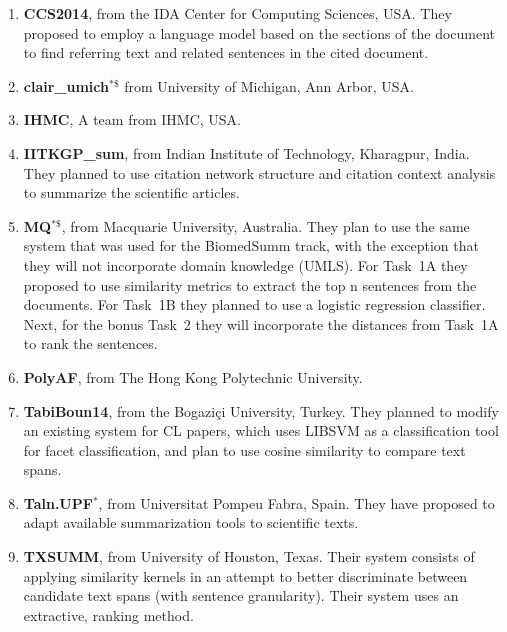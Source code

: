 \documentclass[11pt]{article}
\begin{document}
\begin{enumerate}
\item{{\bf CCS2014}, from the IDA Center for Computing Sciences,
  USA. They proposed to employ a language model based on the sections
  of the document to find referring text and related sentences in the
  cited document.}
\vspace{-.3cm}
\item{{\bf clair\_umich$^{*\$}$} from University of Michigan, Ann Arbor, USA.}
\vspace{-.3cm}
\item{{\bf IHMC}, A team from IHMC, USA.}
\vspace{-.3cm}
\item{{\bf IITKGP\_sum}, from Indian Institute of Technology,
  Kharagpur, India. They planned to use citation network structure and
  citation context analysis to summarize the scientific articles.}
\vspace{-.3cm}
\item{{\bf MQ$^{*\$}$}, from Macquarie University, Australia. They
  plan to use the same system that was used for the BiomedSumm track,
  with the exception that they will not incorporate domain knowledge
  (UMLS). For Task~1A they proposed to use similarity metrics to extract the
  top n sentences from the documents. For Task~1B they planned to use a
  logistic regression classifier. Next, for the bonus Task~2 they will 
  incorporate the distances from Task~1A to rank the sentences.
  }

\vspace{-.3cm}
\item{{\bf PolyAF}, from The Hong Kong Polytechnic University.}
\vspace{-.3cm}
\item{{\bf TabiBoun14}, from the Bogaziçi University, Turkey. They
  planned to modify an existing system for CL papers, which uses
  LIBSVM as a classification tool for facet classification, and plan to 
  use cosine similarity to compare text spans.}
\vspace{-.3cm}
\item{{\bf Taln.UPF$^{*}$}, from Universitat Pompeu Fabra, Spain. They
  have proposed to adapt available summarization tools to scientific
  texts.}
\vspace{-.3cm}
\item{{\bf TXSUMM}, from University of Houston, Texas. Their system
  consists of applying similarity kernels in an attempt to better
  discriminate between candidate text spans (with sentence
  granularity). Their system uses an extractive, ranking method.}

\end{enumerate}
\end{document}
